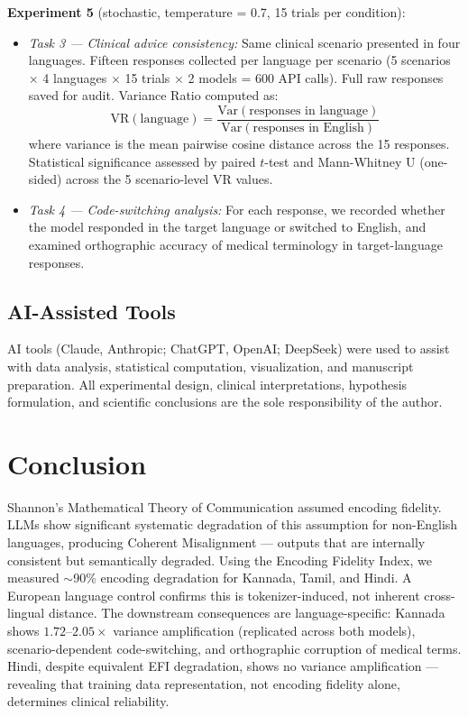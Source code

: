 \documentclass[11pt,a4paper]{article}
\begin{document}
\textbf{Experiment 5} (stochastic, temperature = 0.7, 15 trials per condition):
\begin{itemize}
    \item \emph{Task 3 --- Clinical advice consistency:} Same clinical scenario presented in four languages. Fifteen responses collected per language per scenario (5 scenarios $\times$ 4 languages $\times$ 15 trials $\times$ 2 models = 600 API calls). Full raw responses saved for audit. Variance Ratio computed as:
    \begin{equation}
        \text{VR}(\text{language}) = \frac{\text{Var}(\text{responses in language})}{\text{Var}(\text{responses in English})}
    \end{equation}
    where variance is the mean pairwise cosine distance across the 15 responses. Statistical significance assessed by paired $t$-test and Mann-Whitney U (one-sided) across the 5 scenario-level VR values.
    \item \emph{Task 4 --- Code-switching analysis:} For each response, we recorded whether the model responded in the target language or switched to English, and examined orthographic accuracy of medical terminology in target-language responses.
\end{itemize}

\subsection{AI-Assisted Tools}
AI tools (Claude, Anthropic; ChatGPT, OpenAI; DeepSeek) were used to assist with data analysis, statistical computation, visualization, and manuscript preparation. All experimental design, clinical interpretations, hypothesis formulation, and scientific conclusions are the sole responsibility of the author.

\section{Conclusion}

Shannon's Mathematical Theory of Communication assumed encoding fidelity. LLMs show significant systematic degradation of this assumption for non-English languages, producing Coherent Misalignment --- outputs that are internally consistent but semantically degraded. Using the Encoding Fidelity Index, we measured $\sim$90\% encoding degradation for Kannada, Tamil, and Hindi. A European language control confirms this is tokenizer-induced, not inherent cross-lingual distance. The downstream consequences are language-specific: Kannada shows $1.72$--$2.05\times$ variance amplification (replicated across both models), scenario-dependent code-switching, and orthographic corruption of medical terms. Hindi, despite equivalent EFI degradation, shows no variance amplification --- revealing that training data representation, not encoding fidelity alone, determines clinical reliability.
\end{document}
